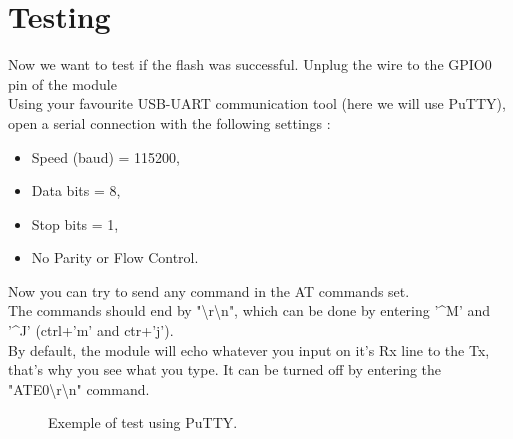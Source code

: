 \documentclass[11pt]{article}
\begin{document}
\section{Testing}
Now we want to test if the flash was successful. Unplug the wire to the GPIO0 pin of the module\\
Using your favourite USB-UART communication tool (here we will use PuTTY), open a serial connection with the following settings :
\begin{itemize}
\item Speed (baud) = 115200,
\item Data bits = 8,
\item Stop bits = 1,
\item No Parity or Flow Control.
\end{itemize}
Now you can try to send any command in the AT commands set.\\
The commands should end by "\textbackslash r\textbackslash n", which can be done by entering '\textasciicircum M' and '\textasciicircum J' (ctrl+'m' and ctr+'j').\\
By default, the module will echo whatever you input on it's Rx line to the Tx, that's why you see what you type. It can be turned off by entering the "ATE0\textbackslash r\textbackslash n" command.\\
\begin{figure}[H]
\caption{Exemple of test using PuTTY.}
\label{putty_exemple}
\end{figure}
\end{document}
